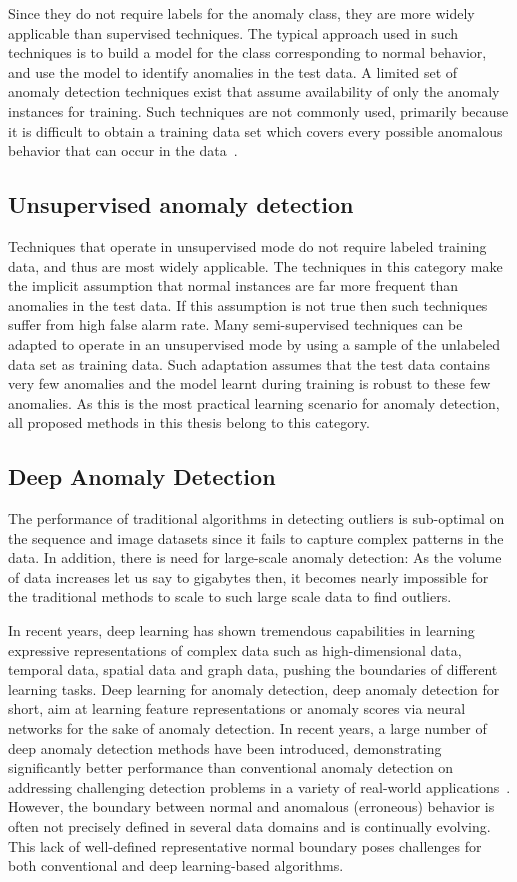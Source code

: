 Since they do not require labels for the anomaly class, they are more widely applicable than supervised techniques. The typical approach used in such techniques is to build a model for the class corresponding to normal behavior, and use the model to identify anomalies in the test data. A limited set of anomaly detection techniques exist that assume availability of only the anomaly instances for training. Such techniques are not commonly used, primarily because it is difficult to obtain a training data set which covers every possible anomalous behavior that can occur in the data~\cite{ruff2019deep}.

\subsection{Unsupervised anomaly detection}
Techniques that operate in unsupervised mode do not require labeled training data, and thus are most widely applicable. The techniques in this category make the implicit assumption that normal instances are far more frequent than anomalies in the test data. If this assumption is not true then such techniques suffer from high false alarm rate. Many semi-supervised techniques can be adapted to operate in an unsupervised mode by using a sample of the unlabeled data set as training data. Such adaptation assumes that the test data contains very few anomalies and the model learnt during training is robust to these few anomalies. As this is the most practical learning scenario for anomaly detection, all proposed methods in this thesis belong to this category.

\subsection{Deep Anomaly Detection}
The performance of traditional algorithms in detecting outliers is sub-optimal on the sequence and image datasets since it fails to capture complex patterns in the data. In addition, there is need for large-scale anomaly detection: As the volume of data increases let us say to gigabytes then, it becomes nearly impossible for the traditional methods to scale to such large scale data to find outliers.

In recent years, deep learning has shown tremendous capabilities in learning expressive representations of complex data such as high-dimensional data, temporal data, spatial data and graph data, pushing the boundaries of different learning tasks. Deep learning for anomaly detection, deep anomaly detection for short, aim at learning feature representations or anomaly scores via neural networks for the sake of anomaly detection. In recent years, a large number of deep anomaly detection methods have been introduced, demonstrating significantly better performance than conventional anomaly detection on addressing challenging detection problems in a variety of real-world applications~\cite{pang2020deep}. However, the boundary between normal and anomalous (erroneous) behavior is often not precisely defined in several data domains and is continually evolving. This lack of well-defined representative normal boundary poses challenges for both conventional and deep learning-based algorithms.


